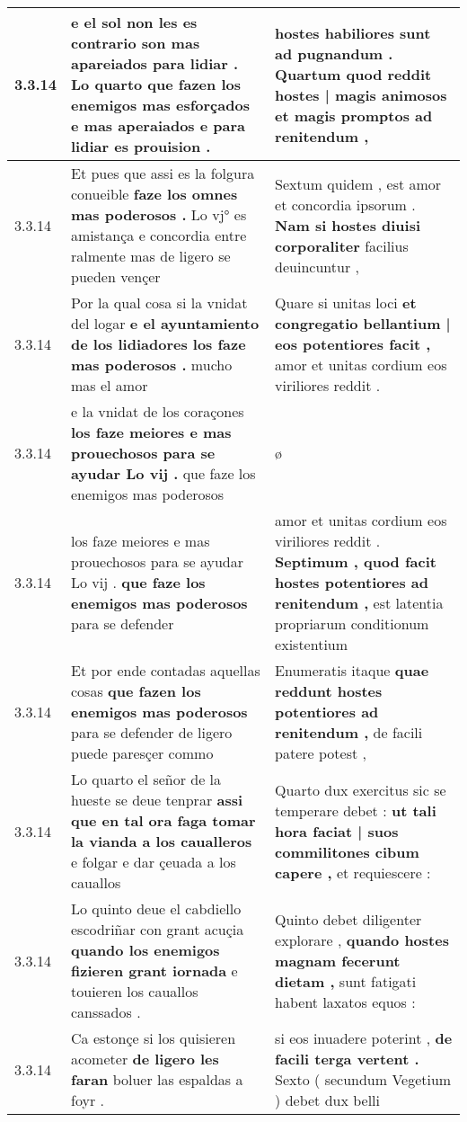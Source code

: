 \begin{tabular}{|p{1cm}|p{6.5cm}|p{6.5cm}|}
3.3.14 & e el sol non les es contrario son mas apareiados para lidiar . \textbf{ Lo quarto que fazen los enemigos mas esforçados e mas aperaiados } e para lidiar es prouision . & hostes habiliores sunt ad pugnandum . \textbf{ Quartum quod reddit hostes | magis animosos } et magis promptos ad renitendum , \\\hline
3.3.14 & Et pues que assi es la folgura conueible \textbf{ faze los omnes mas poderosos . } Lo vj° es amistança e concordia entre ralmente mas de ligero se pueden vençer & Sextum quidem , est amor et concordia ipsorum . \textbf{ Nam si hostes diuisi corporaliter } facilius deuincuntur , \\\hline
3.3.14 & Por la qual cosa si la vnidat del logar \textbf{ e el ayuntamiento de los lidiadores los faze mas poderosos . } mucho mas el amor & Quare si unitas loci \textbf{ et congregatio bellantium | eos potentiores facit , } amor et unitas cordium eos viriliores reddit . \\\hline
3.3.14 & e la vnidat de los coraçones \textbf{ los faze meiores e mas prouechosos para se ayudar Lo vij . } que faze los enemigos mas poderosos & ø \\\hline
3.3.14 & los faze meiores e mas prouechosos para se ayudar Lo vij . \textbf{ que faze los enemigos mas poderosos } para se defender & amor et unitas cordium eos viriliores reddit . \textbf{ Septimum , quod facit hostes potentiores ad renitendum , } est latentia propriarum conditionum existentium \\\hline
3.3.14 & Et por ende contadas aquellas cosas \textbf{ que fazen los enemigos mas poderosos } para se defender de ligero puede paresçer commo & Enumeratis itaque \textbf{ quae reddunt hostes potentiores ad renitendum , } de facili patere potest , \\\hline
3.3.14 & Lo quarto el señor de la hueste se deue tenprar \textbf{ assi que en tal ora faga tomar la vianda a los caualleros } e folgar e dar çeuada a los cauallos & Quarto dux exercitus sic se temperare debet : \textbf{ ut tali hora faciat | suos commilitones cibum capere , } et requiescere : \\\hline
3.3.14 & Lo quinto deue el cabdiello escodriñar con grant acuçia \textbf{ quando los enemigos fizieren grant iornada } e touieren los cauallos canssados . & Quinto debet diligenter explorare , \textbf{ quando hostes magnam fecerunt dietam , } sunt fatigati habent laxatos equos : \\\hline
3.3.14 & Ca estonçe si los quisieren acometer \textbf{ de ligero les faran } boluer las espaldas a foyr . & si eos inuadere poterint , \textbf{ de facili terga vertent . } Sexto ( secundum Vegetium ) debet dux belli \\\hline

\end{tabular}
